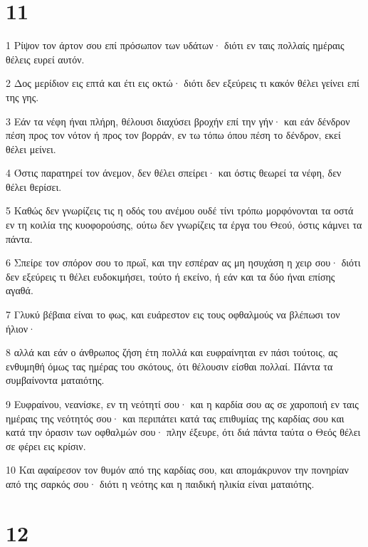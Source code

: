 \chapter{11}

\par 1 Ρίψον τον άρτον σου επί πρόσωπον των υδάτων· διότι εν ταις πολλαίς ημέραις θέλεις ευρεί αυτόν.
\par 2 Δος μερίδιον εις επτά και έτι εις οκτώ· διότι δεν εξεύρεις τι κακόν θέλει γείνει επί της γης.
\par 3 Εάν τα νέφη ήναι πλήρη, θέλουσι διαχύσει βροχήν επί την γήν· και εάν δένδρον πέση προς τον νότον ή προς τον βορράν, εν τω τόπω όπου πέση το δένδρον, εκεί θέλει μείνει.
\par 4 Όστις παρατηρεί τον άνεμον, δεν θέλει σπείρει· και όστις θεωρεί τα νέφη, δεν θέλει θερίσει.
\par 5 Καθώς δεν γνωρίζεις τις η οδός του ανέμου ουδέ τίνι τρόπω μορφόνονται τα οστά εν τη κοιλία της κυοφορούσης, ούτω δεν γνωρίζεις τα έργα του Θεού, όστις κάμνει τα πάντα.
\par 6 Σπείρε τον σπόρον σου το πρωΐ, και την εσπέραν ας μη ησυχάση η χειρ σου· διότι δεν εξεύρεις τι θέλει ευδοκιμήσει, τούτο ή εκείνο, ή εάν και τα δύο ήναι επίσης αγαθά.
\par 7 Γλυκύ βέβαια είναι το φως, και ευάρεστον εις τους οφθαλμούς να βλέπωσι τον ήλιον·
\par 8 αλλά και εάν ο άνθρωπος ζήση έτη πολλά και ευφραίνηται εν πάσι τούτοις, ας ενθυμηθή όμως τας ημέρας του σκότους, ότι θέλουσιν είσθαι πολλαί. Πάντα τα συμβαίνοντα ματαιότης.
\par 9 Ευφραίνου, νεανίσκε, εν τη νεότητί σου· και η καρδία σου ας σε χαροποιή εν ταις ημέραις της νεότητός σου· και περιπάτει κατά τας επιθυμίας της καρδίας σου και κατά την όρασιν των οφθαλμών σου· πλην έξευρε, ότι διά πάντα ταύτα ο Θεός θέλει σε φέρει εις κρίσιν.
\par 10 Και αφαίρεσον τον θυμόν από της καρδίας σου, και απομάκρυνον την πονηρίαν από της σαρκός σου· διότι η νεότης και η παιδική ηλικία είναι ματαιότης.

\chapter{12}

